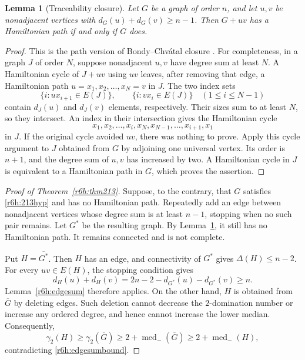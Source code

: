 \documentclass[11pt,a4paper]{article}
\newtheorem{lemma}[theorem]{Lemma}
\theoremstyle{remark}
\begin{document}
\begin{lemma}[Traceability closure]
\label{r6h:closure}
Let $G$ be a graph of order $n$, and let $u,v$ be nonadjacent
vertices with $d_G(u)+d_G(v)\ge n-1$.
Then $G+uv$ has a Hamiltonian path if and only if $G$ does.
\end{lemma}

\begin{proof}
This is the path version of Bondy--Chv\'atal closure
\cite{BondyChvatal76}.
For completeness, in a graph $J$ of order $N$, suppose nonadjacent
$u,v$ have degree sum at least $N$.
A Hamiltonian cycle of $J+uv$ using $uv$ leaves, after removing that
edge, a Hamiltonian path
$u=x_1,x_2,\ldots,x_N=v$ in $J$.
The two index sets
\[
 \{i:ux_{i+1}\in E(J)\},\qquad
 \{i:vx_i\in E(J)\}
 \quad (1\le i\le N-1)
\]
contain $d_J(u)$ and $d_J(v)$ elements, respectively.
Their sizes sum to at least $N$, so they intersect.
An index in their intersection gives the Hamiltonian cycle
\[
 x_1,x_2,\ldots,x_i,x_N,x_{N-1},\ldots,x_{i+1},x_1
\]
in $J$.
If the original cycle avoided $uv$, there was nothing to prove.
Apply this cycle argument to $J$ obtained from $G$ by adjoining one
universal vertex.
Its order is $n+1$, and the degree sum of $u,v$ has increased by two.
A Hamiltonian cycle in $J$ is equivalent to a Hamiltonian path in $G$,
which proves the assertion.
\end{proof}

\begin{proof}[Proof of Theorem~\ref{r6h:thm213}]
Suppose, to the contrary, that $G$ satisfies \eqref{r6h:213hyp} and
has no Hamiltonian path.
Repeatedly add an edge between nonadjacent vertices whose degree
sum is at least $n-1$, stopping when no such pair remains.
Let $G^*$ be the resulting graph.
By Lemma~\ref{r6h:closure}, it still has no Hamiltonian path.
It remains connected and is not complete.

Put $H=\overline{G^*}$.
Then $H$ has an edge, and connectivity of $G^*$ gives
$\Delta(H)\le n-2$.
For every $uv\in E(H)$, the stopping condition gives
\[
 d_H(u)+d_H(v)
 =2n-2-d_{G^*}(u)-d_{G^*}(v)
 \ge n.
\]
Lemma~\ref{r6h:edgesum} therefore applies.
On the other hand, $H$ is obtained from $\overline G$ by deleting
edges.
Such deletion cannot decrease the $2$-domination number or increase
any ordered degree, and hence cannot increase the lower median.
Consequently,
\[
 \gamma_2(H)
 \ge\gamma_2(\overline G)
 \ge2+\operatorname{med}_{-}(\overline G)
 \ge2+\operatorname{med}_{-}(H),
\]
contradicting \eqref{r6h:edgesumbound}.
\end{proof}
\end{document}

